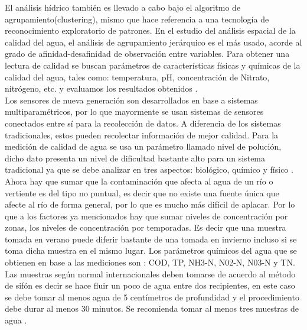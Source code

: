 \documentclass[10pt,a4paper]{article}
\begin{document}
\begin{multicols}{2}
El análisis hídrico también es llevado a cabo bajo el algoritmo de agrupamiento(clustering), mismo que hace referencia a una tecnología de reconocimiento exploratorio de patrones. En el estudio del análisis espacial de la calidad del agua, el análisis de agrupamiento jerárquico es el más usado, acorde al grado de afinidad-desafinidad de observación entre variables.
Para obtener una lectura de calidad se buscan parámetros de características físicas y químicas de la calidad del agua, tales como: temperatura, pH, concentración de Nitrato, nitrógeno, etc. y evaluamos los resultados obtenidos \cite{jingmeng2011research}.\\
Los sensores de nueva generación son desarrollados en base a sistemas multiparamétricos, por lo que mayormente se usan sistemas de sensores conectados entre sí para la recolección de datos. A diferencia de los sistemas tradicionales, estos pueden recolectar información de mejor calidad. Para la medición de calidad de agua se usa un parámetro llamado nivel de polución, dicho dato presenta un nivel de dificultad bastante alto para un sistema tradicional ya que se debe analizar en tres aspectos: biológico, químico y físico \cite{qin2011impact}.\\
Ahora hay que sumar que la contaminación que afecta al agua de un río o vertiente  es del tipo no puntual, es decir que no existe una fuente única que afecte al río de forma general, por lo que es mucho más difícil de aplacar. Por lo que a los factores ya mencionados hay que sumar niveles de concentración por zonas, los niveles de concentración por temporadas. Es decir que una muestra tomada en verano puede diferir bastante de una tomada en invierno incluso si se toma dicha muestra en el mismo lugar. Los parámetros químicos del agua que se obtienen en base a las mediciones  son : COD, TP, NH3-N, N02-N, N03-N y TN. Las muestras según normal internacionales deben tomarse de acuerdo al método de sifón es decir se hace fluir un poco de agua entre dos recipientes, en este caso se debe tomar al menos agua de 5 centímetros de profundidad y el procedimiento debe durar al menos 30 minutos. Se recomienda tomar al menos tres muestras de agua \cite{randhawa2016multi}.
\end{multicols} 
\end{document}
